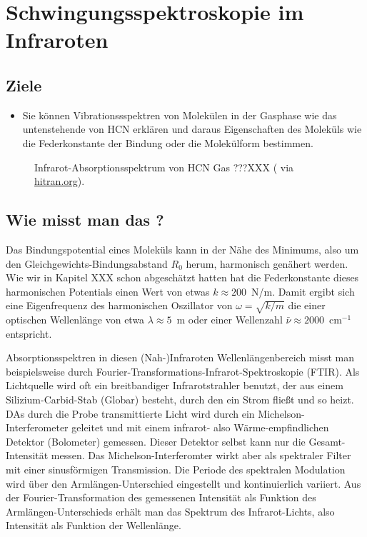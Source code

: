 
\chapter{Schwingungsspektroskopie im Infraroten}


\section{Ziele}

\begin{itemize}
\item Sie können Vibrationssspektren von Molekülen in der Gasphase wie das untenstehende von HCN erklären und daraus Eigenschaften des Moleküls wie die  Federkonstante der Bindung oder die  Molekülform bestimmen.
\end{itemize}


\begin{figure}
\caption{Infrarot-Absorptionsspektrum von HCN Gas ???XXX (\cite{Maki_1995_HCN} via \href{https://hitran.org}{hitran.org}).
\label{fig:vib_hcn}}
\end{figure}



\section{Wie misst man das ?}

Das Bindungspotential eines Moleküls kann in der Nähe des Minimums, also um den Gleichgewichts-Bindungsabstand $R_0$ herum, harmonisch genähert werden.
Wie wir in Kapitel XXX schon abgeschätzt hatten hat die Federkonstante dieses harmonischen Potentials einen Wert von etwas $k \approx 200$~N/m. Damit ergibt sich eine Eigenfrequenz des harmonischen Oszillator von $\omega = \sqrt{k / m}$ die einer optischen Wellenlänge von etwa $\lambda \approx 5$~\textmu m oder einer Wellenzahl $\bar{\nu} \approx 2000$~cm$^{-1}$ entspricht. 

Absorptionsspektren in diesen (Nah-)Infraroten Wellenlängenbereich misst man beispielsweise durch Fourier-Transformations-Infrarot-Spektroskopie (FTIR). Als Lichtquelle wird oft ein breitbandiger Infrarotstrahler benutzt, der aus einem Silizium-Carbid-Stab (Globar) besteht, durch den ein Strom fließt und so heizt. DAs durch die Probe transmittierte Licht wird durch ein Michelson-Interferometer geleitet und mit einem infrarot-  also Wärme-empfindlichen Detektor (Bolometer) gemessen. Dieser Detektor selbst kann nur die Gesamt-Intensität messen. Das Michelson-Interferomter wirkt aber als spektraler Filter mit einer sinusförmigen Transmission. Die Periode des spektralen Modulation wird über den Armlängen-Unterschied eingestellt und kontinuierlich variiert. Aus der Fourier-Transformation des gemessenen Intensität als Funktion des Armlängen-Unterschieds erhält man das Spektrum des Infrarot-Lichts, also Intensität als Funktion der Wellenlänge.



